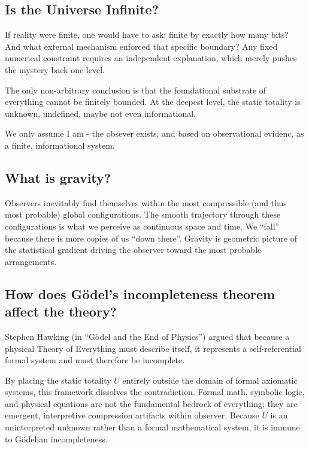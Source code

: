 \subsection*{Is the Universe Infinite?}

If reality were finite, one would have to ask: finite by exactly how many bits?
And what external mechanism enforced that specific boundary?
Any fixed numerical constraint requires an independent explanation, which merely pushes the mystery back one level. 

The only non-arbitrary conclusion is that the foundational substrate of everything cannot be finitely bounded.
At the deepest level, the static totality is unknown, undefined, maybe not even informational.

We only assume I am - the obsever exists, and based on observational evidenc, as a finite, informational system.


\subsection*{What is gravity?}

Observers inevitably find themselves within the most compressible (and thus most probable) global configurations.
The smooth trajectory through these configurations is what we perceive as continuous space and time.
We ``fall'' because there is more copies of us ``down there''.
Gravity is geometric  picture of the statistical gradient driving the observer toward the most probable arrangements.


\subsection*{How does Gödel's incompleteness theorem affect the theory?}

Stephen Hawking (in ``Gödel and the End of Physics'') argued that because a physical Theory of Everything must describe itself,
it represents a self-referential formal system and must therefore be incomplete. 

By placing the static totality $U$ entirely outside the domain of formal axiomatic systems, this framework dissolves the contradiction.
Formal math, symbolic logic, and physical equations are not the fundamental bedrock of everything; they are emergent,
interpretive compression artifacts within observer.
Because $U$ is an uninterpreted unknown rather than a formal mathematical system, it is immune to Gödelian incompleteness.


